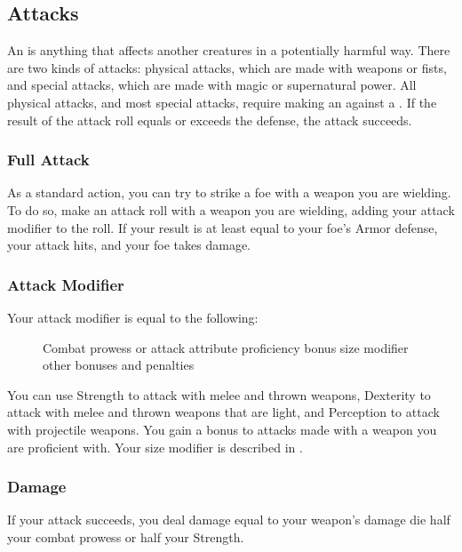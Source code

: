 \subsection{Attacks}\label{Attacks}
An  is anything that affects another creatures in a potentially harmful way.
There are two kinds of attacks: physical attacks, which are made with weapons or fists, and special attacks, which are made with magic or supernatural power.
All physical attacks, and most special attacks, require making an  against a .
If the result of the attack roll equals or exceeds the defense, the attack succeeds.

\subsubsection{Full Attack}\label{Full Attack}
As a standard action, you can try to strike a foe with a weapon you are wielding.
To do so, make an attack roll with a weapon you are wielding, adding your attack modifier to the roll.
If your result is at least equal to your foe's Armor defense, your attack hits, and your foe takes damage.

\subsubsection{Attack Modifier}
Your attack modifier is equal to the following:

\begin{figure}[h]
    \centering Combat prowess or attack attribute \add proficiency bonus  \add size modifier \add other bonuses and penalties
\end{figure}

 You can use Strength to attack with melee and thrown weapons, Dexterity to attack with melee and thrown weapons that are light, and Perception to attack with projectile weapons.
 You gain a  bonus to attacks made with a weapon you are proficient with.
 Your size modifier is described in .

\subsubsection{Damage}
If your attack succeeds, you deal damage equal to your weapon's damage die \add half your combat prowess or half your Strength.


